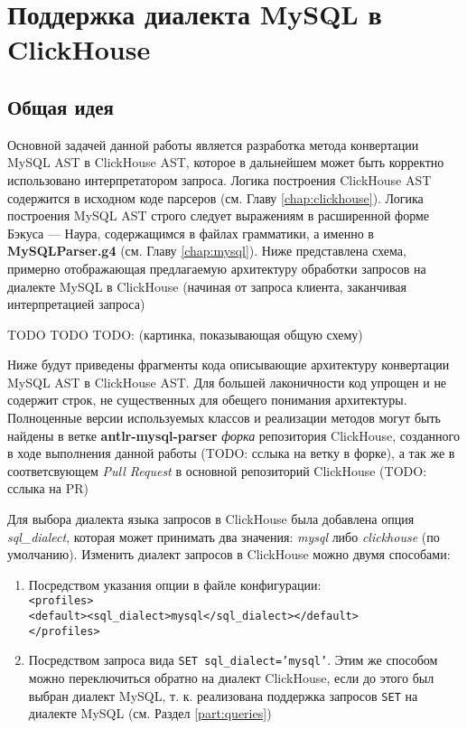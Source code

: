 \section{Поддержка диалекта MySQL в ClickHouse} \label{chap:conversion}
\subsection{Общая идея}
Основной задачей данной работы является разработка метода конвертации MySQL AST в ClickHouse AST, которое в дальнейшем может быть корректно использовано интерпретатором запроса. Логика построения ClickHouse AST содержится в исходном коде парсеров (см. Главу \ref{chap:clickhouse}).  Логика построения MySQL AST строго следует выражениям в расширенной форме Бэкуса — Наура, содержащимся в файлах грамматики, а именно в \textbf{MySQLParser.g4} (см. Главу \ref{chap:mysql}). Ниже представлена схема, примерно отображающая предлагаемую архитектуру обработки запросов на диалекте MySQL в ClickHouse (начиная от запроса клиента, заканчивая интерпретацией запроса)

TODO TODO TODO: (картинка, показывающая общую схему)

Ниже будут приведены фрагменты кода описывающие архитектуру конвертации MySQL AST в ClickHouse AST. Для большей лаконичности код упрощен и не содержит строк, не существенных для обещего понимания архитектуры. Полноценные версии используемых классов и реализации методов могут быть найдены в ветке \textbf{antlr-mysql-parser} \textit{форка} репозитория ClickHouse, созданного в ходе выполнения данной работы (TODO: сслыка на ветку в форке), а так же в соответсвующем \textit{Pull Request} в основной репозиторий ClickHouse (TODO: сслыка на PR)

Для выбора диалекта языка запросов в ClickHouse была добавлена опция \textit{sql\_dialect}, которая может принимать два значения: \textit{mysql} либо \textit{clickhouse} (по умолчанию). Изменить диалект запросов в ClickHouse можно двумя способами:

\begin{enumerate}
    \item Посредством указания опции в файле конфигурации:\\ \texttt{<profiles>}\\\texttt{<default><sql_dialect>mysql</sql_dialect></default>}\\ \texttt{</profiles>}
    \item Посредством запроса вида \texttt{SET sql_dialect='mysql'}. Этим же способом можно переключиться обратно на диалект ClickHouse, если до этого был выбран диалект MySQL, т. к. реализована поддержка запросов \texttt{SET} на диалекте MySQL (см. Раздел \ref{part:queries})
\end{enumerate}

